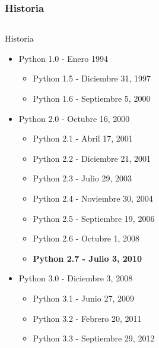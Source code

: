 \documentclass[10pt,colorlinks]{beamer}
\begin{document}
\begin{frame}[fragile]\frametitle{Historia}
\begin{columns}[T]
    \begin{column}{.7\textwidth}
        \begin{block}{\centering Historia}
\small
            \begin{itemize}
                 \item Python 1.0 - Enero 1994
                    \begin{itemize}
\tiny
                        \item Python 1.5 - Diciembre 31, 1997
                        \item Python 1.6 - Septiembre 5, 2000
                    \end{itemize}
                \item Python 2.0 - Octubre 16, 2000
                    \begin{itemize}
\tiny
                        \item Python 2.1 - Abril 17, 2001
                        \item Python 2.2 - Diciembre 21, 2001
                        \item Python 2.3 - Julio 29, 2003
                        \item Python 2.4 - Noviembre 30, 2004
                        \item Python 2.5 - Septiembre 19, 2006
                        \item Python 2.6 - Octubre 1, 2008
                        \item \textbf{Python 2.7 - Julio 3, 2010}
                    \end{itemize}
                \item Python 3.0 - Diciembre 3, 2008
                    \begin{itemize}
\tiny
                        \item Python 3.1 - Junio 27, 2009
                        \item Python 3.2 - Febrero 20, 2011
                        \item Python 3.3 - Septiembre 29, 2012
                    \end{itemize}
            \end{itemize}
        \end{block}
    \end{column}
    \begin{column}{.3\textwidth}

\end{column}
\end{columns}
\end{frame}
\end{document}
